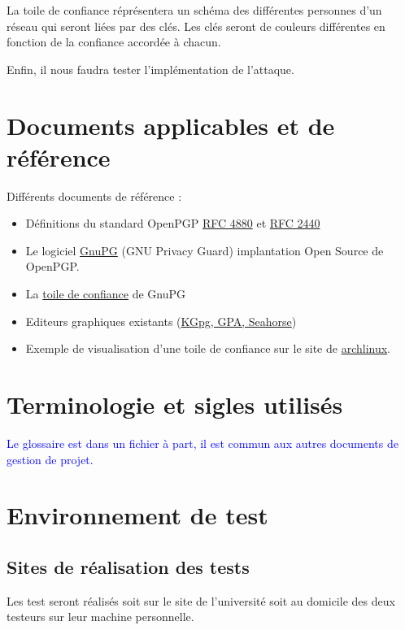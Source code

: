 \documentclass{../res/univ-projet}
\begin{document}
La toile de confiance réprésentera un schéma des différentes personnes d'un réseau qui seront liées par des clés.
Les clés seront de couleurs différentes en fonction de la confiance accordée à chacun.

Enfin, il nous faudra tester l'implémentation de l'attaque. 


\section{Documents applicables et de référence}
Différents documents de référence :
\begin{itemize}
\item Définitions du standard OpenPGP \href{file:../../ressources/openPGP/rfc4880-en.pdf}{RFC 4880}
  et \href{file:../../ressources/openPGP/rfc2440-fr.pdf}{RFC 2440}
\item Le logiciel \href{https://www.gnupg.org/}{GnuPG} (GNU Privacy Guard) implantation Open Source
  de OpenPGP.
\item La \href{https://www.gnupg.org/gph/fr/manual.html#AEN541}{toile de confiance} de GnuPG
\item Editeurs graphiques existants 
  (\href{http://www.gnupg.org/related_software/frontends.en.html}{KGpg, GPA, Seahorse})
\item Exemple de visualisation d'une toile de confiance sur le site de 
  \href{https://www.archlinux.org/master-keys/#visualization}{archlinux}.
\end{itemize}

\section{Terminologie et sigles utilisés}
\textcolor{blue}{
  Le glossaire est dans un fichier à part, il est commun aux autres documents de gestion de projet.
}

\section{Environnement de test}
\subsection{Sites de réalisation des tests}
Les test seront réalisés soit sur le site de l'université soit au domicile des deux testeurs sur leur machine personnelle.
\end{document}
